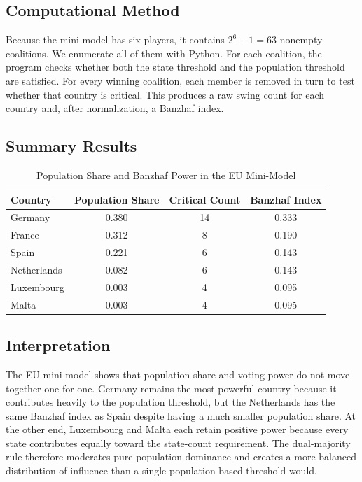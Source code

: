 \documentclass[lettersize,journal]{IEEEtran}
\begin{document}
\subsection{Computational Method}
Because the mini-model has six players, it contains $2^6-1=63$ nonempty coalitions. We enumerate all of them with Python. For each coalition, the program checks whether both the state threshold and the population threshold are satisfied. For every winning coalition, each member is removed in turn to test whether that country is critical. This produces a raw swing count for each country and, after normalization, a Banzhaf index.

\subsection{Summary Results}
\begin{table}[!t]
\caption{Population Share and Banzhaf Power in the EU Mini-Model}
\label{tab:eu_mini_summary}
\centering
\footnotesize
\begin{tabular}{l c c c}
\toprule
Country & Population Share & Critical Count & Banzhaf Index \\
\midrule
Germany & 0.380 & 14 & 0.333 \\
France & 0.312 & 8 & 0.190 \\
Spain & 0.221 & 6 & 0.143 \\
Netherlands & 0.082 & 6 & 0.143 \\
Luxembourg & 0.003 & 4 & 0.095 \\
Malta & 0.003 & 4 & 0.095 \\
\bottomrule
\end{tabular}
\end{table}



\subsection{Interpretation}
The EU mini-model shows that population share and voting power do not move together one-for-one. Germany remains the most powerful country because it contributes heavily to the population threshold, but the Netherlands has the same Banzhaf index as Spain despite having a much smaller population share. At the other end, Luxembourg and Malta each retain positive power because every state contributes equally toward the state-count requirement. The dual-majority rule therefore moderates pure population dominance and creates a more balanced distribution of influence than a single population-based threshold would.
\end{document}
